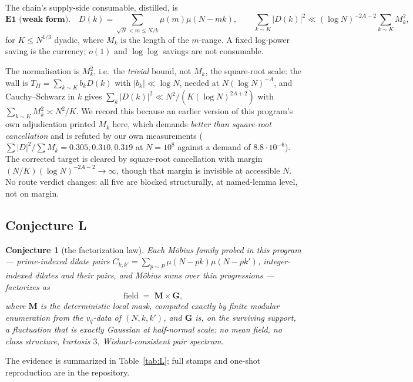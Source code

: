 \documentclass[11pt,a4paper]{article}
\theoremstyle{plain}
\newtheorem{conjecture}[theorem]{Conjecture}
\theoremstyle{definition}
\begin{document}
The chain's supply-side consumable, distilled, is
\[
  \textbf{E1 (weak form).}\quad
  D(k) = \!\!\sum_{\sqrt N < m \le N/k}\!\! \mu(m)\mu(N-mk),
  \qquad
  \sum_{k\sim K}|D(k)|^2 \ll (\log N)^{-2A-2}\sum_{k\sim K} M_k^2,
\]
for $K \le N^{1/3}$ dyadic, where $M_k$ is the length of the $m$-range.
A fixed log-power saving is the currency; $o(1)$ and $\log\log$ savings
are not consumable.

The normalisation is $M_k^2$, i.e.\ the \emph{trivial} bound, not
$M_k$, the square-root scale: the wall is
$T_{II} = \sum_{k\sim K}b_kD(k)$ with $|b_k|\ll\log N$, needed at
$N(\log N)^{-A}$, and Cauchy--Schwarz in $k$ gives
$\sum_k|D(k)|^2 \ll N^2/(K(\log N)^{2A+2})$ with
$\sum_{k\sim K}M_k^2 \asymp N^2/K$. We record this because an earlier
version of this program's own adjudication printed $M_k$ here, which
demands \emph{better than square-root cancellation} and is refuted by
our own measurements ($\sum|D|^2/\sum M_k = 0.305,0.310,0.319$ at
$N=10^8$ against a demand of $8.8\cdot10^{-6}$). The corrected target
is cleared by square-root cancellation with margin
$(N/K)(\log N)^{-2A-2}\to\infty$, though that margin is invisible at
accessible $N$. No route verdict changes: all five are blocked
structurally, at named-lemma level, not on margin.

\subsection{Conjecture L}

\begin{conjecture}[the factorization law]\label{conj:L}
Each M\"obius family probed in this program --- prime-indexed dilate
pairs $C_{k,k'} = \sum_{p\sim P}\mu(N-pk)\mu(N-pk')$, integer-indexed
dilates and their pairs, and M\"obius sums over thin progressions ---
factorizes as
\[
  \text{field} \;=\; \mathbf M \times \mathbf G,
\]
where $\mathbf M$ is the deterministic local mask, computed exactly by
finite modular enumeration from the $v_q$-data of $(N,k,k')$, and
$\mathbf G$ is, on the surviving support, a fluctuation that is
exactly Gaussian at half-normal scale: no mean field, no class
structure, kurtosis $3$, Wishart-consistent pair spectrum.
\end{conjecture}

The evidence is summarized in Table~\ref{tab:L}; full stamps and
one-shot reproduction are in the repository.
\end{document}
